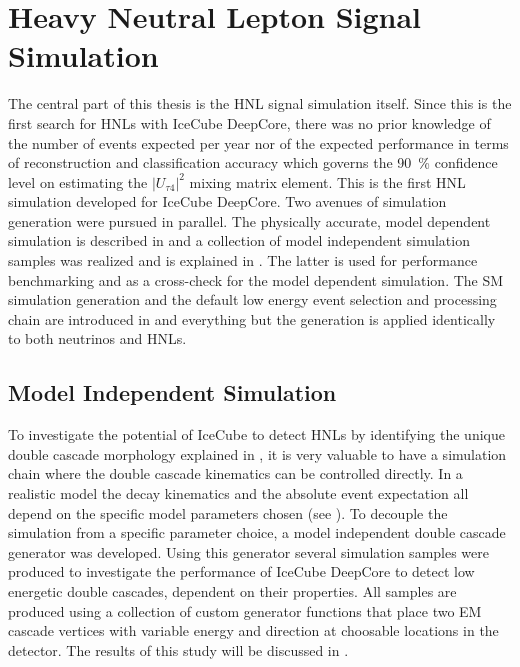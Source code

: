 \setchapterpreamble[u]{\margintoc}

\chapter{Heavy Neutral Lepton Signal Simulation}


The central part of this thesis is the HNL signal simulation itself. Since this is the first search for HNLs with IceCube DeepCore, there was no prior knowledge of the number of events expected per year nor of the expected performance in terms of reconstruction and classification accuracy which governs the \SI{90}{\percent} confidence level on estimating the $|U_{\tau4}|^2$ mixing matrix element. This is the first HNL simulation developed for IceCube DeepCore. Two avenues of simulation generation were pursued in parallel. The physically accurate, model dependent simulation is described in  and a collection of model independent simulation samples was realized and is explained in . The latter is used for performance benchmarking and as a cross-check for the model dependent simulation. The SM simulation generation and the default low energy event selection and processing chain are introduced in  and everything but the generation is applied identically to both neutrinos and HNLs.


\section{Model Independent Simulation} 

To investigate the potential of IceCube to detect HNLs by identifying the unique double cascade morphology explained in , it is very valuable to have a simulation chain where the double cascade kinematics can be controlled directly. In a realistic model the decay kinematics and the absolute event expectation all depend on the specific model parameters chosen (see ). To decouple the simulation from a specific parameter choice, a model independent double cascade generator was developed. Using this generator several simulation samples were produced to investigate the performance of IceCube DeepCore to detect low energetic double cascades, dependent on their properties. All samples are produced using a collection of custom generator functions \cite{cascade_generator_functions} that place two EM cascade vertices with variable energy and direction at choosable locations in the detector. The results of this study will be discussed in .


